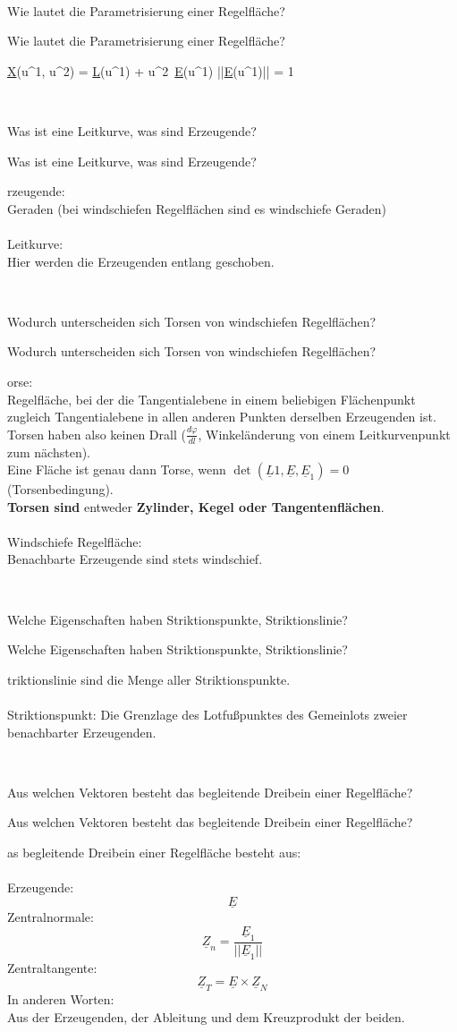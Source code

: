 \documentclass[DIV=1]{scrartcl}
\newcommand{\frage}[3][10]{
    \newpage
    \ 
    \vspace{#1 em}
    \begin{framed}
        #2
    \end{framed}
    \newpage
    \begin{framed}
        #2
    \end{framed}
    \vspace{2 em}
}
\begin{document}



\frage{Wie lautet die Parametrisierung einer Regelfläche?}

\[
    \underline{X}(u^1, u^2) = \underline{L}(u^1) + u^2\, \underline{E}(u^1)
    \quad \text{mit} \quad ||\underline{E}(u^1)|| = 1
\]



\frage{Was ist eine Leitkurve, was sind Erzeugende?}

Erzeugende:\\
Geraden (bei windschiefen Regelflächen sind es windschiefe Geraden)\\
\\
Leitkurve:\\
Hier werden die Erzeugenden entlang geschoben.




\frage{Wodurch unterscheiden sich Torsen von windschiefen Regelflächen?}

Torse:\\
Regelfläche, bei der die Tangentialebene in einem beliebigen Flächenpunkt zugleich Tangentialebene in allen anderen Punkten derselben Erzeugenden ist. Torsen haben also keinen Drall ($\frac{d\varphi}{dl}$, Winkeländerung von einem Leitkurvenpunkt zum nächsten).\\
Eine Fläche ist genau dann Torse, wenn $\det(\underline{L}1, \underline{E}, \underline{E}_1) = 0$ (Torsenbedingung).\\
\textbf{Torsen sind} entweder \textbf{Zylinder, Kegel oder Tangentenflächen}.\\
\\
Windschiefe Regelfläche:\\
Benachbarte Erzeugende sind stets windschief.




\frage{Welche Eigenschaften haben Striktionspunkte, Striktionslinie?}

Striktionslinie sind die Menge aller Striktionspunkte.\\
\\
Striktionspunkt: Die Grenzlage des Lotfußpunktes des Gemeinlots zweier benachbarter Erzeugenden.



\frage{Aus welchen Vektoren besteht das begleitende Dreibein einer Regelfläche?}

Das begleitende Dreibein einer Regelfläche besteht aus:\\
\\
Erzeugende:
\[
    \underline{E}
\]
Zentralnormale:
\[
    \underline{Z}_n = \frac{\underline{E}_1}{||\underline{E}_1||}
\]
Zentraltangente:
\[
    \underline{Z}_T = \underline{E} \times \underline{Z}_N
\]
In anderen Worten:\\
Aus der Erzeugenden, der Ableitung und dem Kreuzprodukt der beiden.




\newpage
\listoftodos
\end{document}

